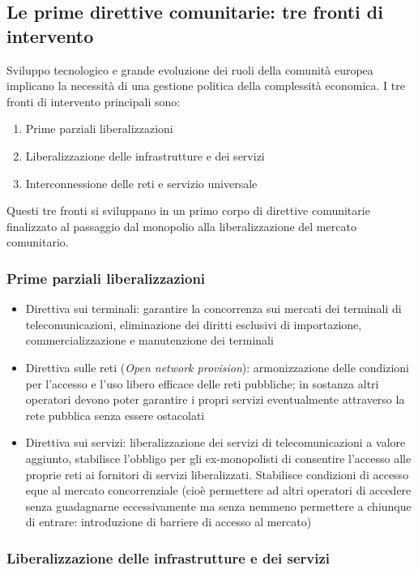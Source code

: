 \subsection{Le prime direttive comunitarie: tre fronti di intervento}

Sviluppo tecnologico e grande evoluzione dei ruoli della comunità europea implicano la necessità di una gestione politica della complessità economica. I tre fronti di intervento principali sono:
\begin{enumerate}
    \item Prime parziali liberalizzazioni
    \item Liberalizzazione delle infrastrutture e dei servizi
    \item Interconnessione delle reti e servizio universale 
\end{enumerate}

Questi tre fronti si sviluppano in un primo corpo di direttive comunitarie finalizzato al passaggio dal monopolio alla liberalizzazione del mercato comunitario.

\subsubsection{Prime parziali liberalizzazioni}
\begin{itemize}
    \item Direttiva sui terminali: garantire la concorrenza sui mercati dei terminali di telecomunicazioni, eliminazione dei diritti esclusivi di importazione, commercializzazione e manutenzione dei terminali
    \item Direttiva sulle reti (\textit{Open network provision}): armonizzazione delle condizioni per l'accesso e l'uso libero efficace delle reti pubbliche; in sostanza altri operatori devono poter garantire i propri servizi eventualmente attraverso la rete pubblica senza essere ostacolati
    \item Direttiva sui servizi: liberalizzazione dei servizi di telecomunicazioni a valore aggiunto, stabilisce l'obbligo per gli ex-monopolisti di consentire l'accesso alle proprie reti ai fornitori di servizi liberalizzati. Stabilisce condizioni di accesso eque al mercato concorrenziale (cioè permettere ad altri operatori di accedere senza guadagnarne eccessivamente ma senza nemmeno permettere a chiunque di entrare: introduzione di barriere di accesso al mercato)
\end{itemize}

\subsubsection{Liberalizzazione delle infrastrutture e dei servizi}

